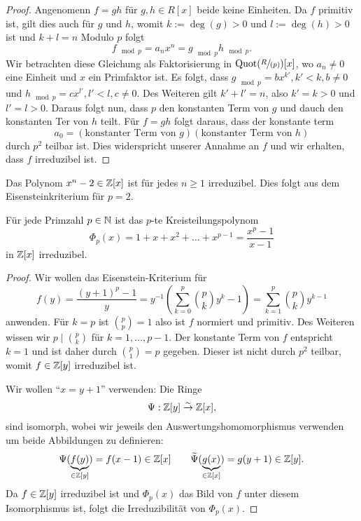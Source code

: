 \begin{proof}
	Angenomenn $f = gh$ für $g,h \in R[x]$ beide keine Einheiten.
	Da $f$ primitiv ist, gilt dies auch für $g$ und $h$, womit $k := \deg(g) > 0$ und $l := \deg(h) > 0$ ist und $k+l = n$
	Modulo $p$ folgt
	\[
	f_{\mod p} = a_{n} x^{n} = g_{\mod p} h_{\mod p}
	.\] 
	Wir betrachten diese Gleichung als Faktorisierung in $\operatorname{Quot}(\sfrac{R}{(p)})[x]$, wo $a_{n} \neq 0$ eine Einheit und $x$ ein Primfaktor ist.
	Es folgt, dass $g_{\mod p} = b x^{k'}, k' < k, b \neq 0$ und $h_{\mod p} = c x^{l'}, l' < l, c \neq 0$.
	Des Weiteren gilt $k' + l' = n$, also $k' = k > 0$ und $l' = l > 0$.
	Daraus folgt nun, dass $p$ den konstanten Term von $g$ und dauch den konstanten Ter von $h$ teilt.
	Für $f = g h$ folgt daraus, dass der konstante term 
	\[
		a_0 = (\text{konstanter Term von } g)(\text{konstanter Term von } h)
	\]
	durch $p^2$ teilbar ist. Dies widerspricht unserer Annahme an $f$ und wir erhalten, dass $f$ irreduzibel ist.
\end{proof}

\begin{eg}
	Das Polynom $x^{n} - 2 \in \mathbb{Z}[x]$ ist für jedes $n \geq 1$ irreduzibel.
	Dies folgt aus dem Eisensteinkriterium für $p = 2$.
\end{eg}

\begin{corollary}
	Für jede Primzahl $p \in \mathbb{N}$ ist das $p$-te Kreisteilungspolynom
	\[
		\Phi_{p}(x) = 1 + x+ x^2 + \ldots + x^{p-1} = \frac{x^{p} -1}{x-1}
	\] 
	in $\mathbb{Z}[x]$ irreduzibel.
\end{corollary}

\begin{proof}
	Wir wollen das Eisenstein-Kriterium für
	\[f(y) = \frac{(y+1)^{p}-1}{y} = y^{-1} \left(\sum_{k=0}^{p} \binom{p}{k} y^{k}-1 \right) = \sum_{k=1}^{p} \binom{p}{k} y^{k-1}
	\]
	anwenden. Für $k = p$ ist $\binom{p}{p} = 1$ also ist $f$ normiert und primitiv.
	Des Weiteren wissen wir $p \mid \binom{p}{k}$ für $k= 1,\ldots,p-1$.
	Der konstante Term von $f$ entspricht $k=1$ und ist daher durch $\binom{p}{1} = p$ gegeben.
	Dieser ist nicht durch $p^2$ teilbar, womit $f \in \mathbb{Z}[y]$ irreduzibel ist.

	Wir wollen  \enquote{$x=y+1$} verwenden: Die Ringe
	\[
		\Psi: \mathbb{Z}[y] \stackrel{\sim}{\rightarrow} \mathbb{Z}[x]
	,\] 
	sind isomorph, wobei wir jeweils den Auswertungshomomorphismus verwenden um beide Abbildungen zu definieren:
	\[
		\Psi(\underbrace{f(y)}_{\in \mathbb{Z}[y]}) = f(x-1) \in \mathbb{Z}[x] \qquad \widetilde{\Psi}(\underbrace{g(x)}_{\in \mathbb{Z}[x]}) = g(y+1) \in \mathbb{Z}[y]
	.\]
	Da $f \in \mathbb{Z}[y]$  irreduzibel ist und $\Phi_{p}(x)$ das Bild von $f$ unter diesem Isomorphismus ist, folgt die Irreduzibilität von $\Phi_{p}(x)$.
\end{proof}

